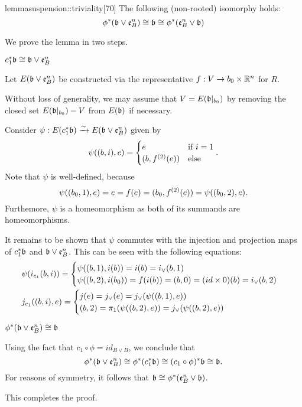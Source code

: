\begin{mystatement}{lemma}{suspension::triviality}[70]
    The following (non-rooted) isomorphy holds:
    \[ \ind{\phi}(\bb \vee \be{B}) \cong \bb \cong \ind{\phi}(\be{B} \vee \bb) \]
\end{mystatement}

\begin{myproof}
    We prove the lemma in two steps.
    \begin{steps}
        \item $\ind{c_1}\bb \cong \bb \vee \be{B}$
        
        Let $E(\bb \vee \be{B})$ be constructed via 
        the representative $f: V \to b_0 \cross \R^n$ for $R$.

        Without loss of generality, we may assume that
        $V = E(\bbb)$ by removing the closed set $E(\bbb) - V$ from $E(\bb)$ if necessary.

        Consider $\psi: E(\ind{c_1}\bb) \isomto E(\bb \vee \be{B})$ given by
        \[ \psi((b, i), e) = \case{e}{(b, \snd{f}(e))}{i = 1}. \]
        Note that $\psi$ is well-defined, because
        \[ \psi((b_0, 1), e) = e = f(e) = (b_0, \snd{f}(e)) = \psi((b_0, 2), e). \]
        Furthemore, $\psi$ is a homeomorphism as both of its summands are homeomorphisms.

        It remains to be shown that $\psi$
        commutes with the injection and projection maps of $\ind{c_1}\bb$ and $\bb \vee \be{B}$.
        This can be seen with the following equations:
        \begin{align}
            &\psi(i_{c_1}(b, i)) = \casenif{\psi((b, 1), i(b)) = i(b) = i_\vee(b, 1)}{\psi((b, 2), i(b_0)) = f(i(b)) = (b, 0) = (id \cross 0)(b) = i_\vee(b, 2)} \\
            &j_{c_1}((b, i), e) = \casenif{j(e) = j_\vee(e) = j_\vee(\psi((b, 1), e))}{(b, 2) = \pi_1(\psi((b, 2), e)) = j_\vee(\psi((b, 2), e))}
        \end{align}
        
        \item $\ind{\phi}(\bb \vee \be{B}) \cong \bb$

        Using the fact that $c_1 \circ \phi = id_{B \vee B}$, we conclude that
        \[ \ind{\phi}(\bb \vee \be{B}) \cong \ind{\phi}(\ind{c_1}\bb) \cong \ind{(c_1 \circ \phi)}\bb \cong \bb. \]
        For reasons of symmetry, it follows that $\bb \cong \ind{\phi}(\be{B} \vee \bb)$.
    \end{steps}
    This completes the proof.
\end{myproof}